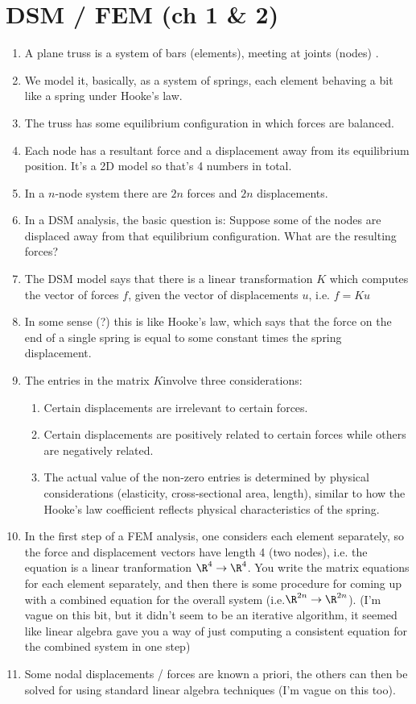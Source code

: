 \section{DSM / FEM (ch 1 \& 2)}
\begin{enumerate}
\item A plane truss is a system of bars (elements), meeting at joints (nodes) .
\item We model it, basically, as a system of springs, each element behaving a bit like a spring under Hooke's law.
\item The truss has some equilibrium configuration in which forces are balanced.
\item Each node has a resultant force and a displacement away from its equilibrium position. It's a 2D model so that's 4 numbers in total.
\item In a $n$-node system there are $2n$ forces and $2n$ displacements.
\item In a DSM analysis, the basic question is: Suppose some of the nodes are displaced away from that equilibrium configuration. What are the resulting
  forces?
\item The DSM model says that there is a linear transformation $K$ which computes the vector of forces $f$, given the vector of
  displacements $u$, i.e. $f = K u$
\item In some sense (?) this is like Hooke's law, which says that the force on the end of a single spring is equal to some constant times the spring
  displacement.
\item The entries in the matrix $K$involve three considerations:
  \begin{enumerate}
  \item Certain displacements are irrelevant to certain forces.
  \item Certain displacements are positively related to certain forces while others are negatively related.
  \item The actual value of the non-zero entries is determined by physical considerations (elasticity, cross-sectional area, length), similar to
    how the Hooke's law coefficient reflects physical characteristics of the spring.
  \end{enumerate}
\item In the first step of a FEM analysis, one considers each element separately, so the force and displacement vectors have length 4 (two nodes),
  i.e. the equation is a linear tranformation $\R^4 \to \R^4$. You write the matrix equations for each element separately, and then there is some
  procedure for coming up with a combined equation for the overall system (i.e.$\R^{2n} \to \R^{2n}$). (I'm vague on this bit, but it didn't seem to be an
  iterative algorithm, it seemed like linear algebra gave you a way of just computing a consistent equation for the combined system in one step)
\item Some nodal displacements / forces are known a priori, the others can then be solved for using standard linear algebra techniques (I'm vague on this
  too).
\end{enumerate}

